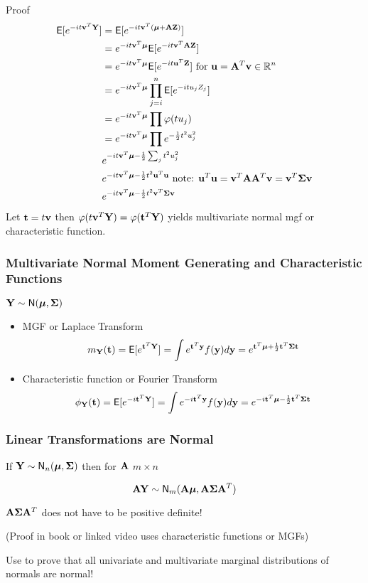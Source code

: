 \documentclass[handout]{beamer}
\begin{document}
\begin{frame}{Proof}
\begin{align*}
\textsf{E}[e^{-i t\mathbf{v}^T\mathbf{Y}}] & =\textsf{E}[e^{-i t \mathbf{v}^T(\boldsymbol{\mu} + \mathbf{A} \mathbf{Z})}] \\
                & = e^{-i t \mathbf{v}^T{\boldsymbol{\mu}}} \textsf{E}[e^{-it \mathbf{v}^T\mathbf{A} \mathbf{Z}}]  \\
                & =  e^{-i t \mathbf{v}^T{\boldsymbol{\mu}}} \textsf{E}[e^{-it \mathbf{u}^T \mathbf{Z}}] \text{ for } \mathbf{u} = \mathbf{A}^T\mathbf{v} \in \mathbb{R}^n \\
                & =  e^{-i t \mathbf{v}^T{\boldsymbol{\mu}}} \prod_{j = i}^n\textsf{E}[e^{-it u_j Z_j}] \\
                 & =  e^{-i t \mathbf{v}^T{\boldsymbol{\mu}}} \prod \varphi(t u_j) \\
                   & =  e^{-i t \mathbf{v}^T{\boldsymbol{\mu}}} \prod e^{- \frac 1 2 t^2 u_j^2} \\
                   & e^{-i t \mathbf{v}^T \boldsymbol{\mu}   - \frac 1 2 \sum_j t^2 u_j^2} \\
                   & e^{-i t \mathbf{v}^T \boldsymbol{\mu} - \frac 1 2 t^2 \mathbf{u}^T\mathbf{u}}  \text{ note: } \mathbf{u}^T\mathbf{u} = \mathbf{v}^T\mathbf{A}\mathbf{A}^T\mathbf{v} = \mathbf{v}^T\boldsymbol{\Sigma} \mathbf{v} \\
                   &  e^{-i t \mathbf{v}^T \boldsymbol{\mu} - \frac 1 2 t^2 \mathbf{v}^T\boldsymbol{\Sigma} \mathbf{v} }
\end{align*}
Let $\mathbf{t} = t \mathbf{v}$ then $\varphi(t \mathbf{v}^T \mathbf{Y}) = \varphi(\mathbf{t}^T \mathbf{Y})$ yields multivariate normal mgf or characteristic function.
\end{frame}

\begin{frame} \frametitle{Multivariate Normal Moment Generating and Characteristic Functions}

$\mathbf{Y} \sim \textsf{N}(\boldsymbol{\mu}, \boldsymbol{\Sigma})$

\begin{itemize}
  \item MGF or Laplace Transform
  $$m_{\mathbf{Y}}(\mathbf{t}) = \textsf{E}[e^{\mathbf{t}^T\mathbf{Y}}]
  = \int e^{\mathbf{t}^T\mathbf{y}} f(\mathbf{y})  d\mathbf{y}
= e^{\mathbf{t}^T\boldsymbol{\mu} + \frac{1}{2} \mathbf{t}^T \boldsymbol{\Sigma} \mathbf{t}}
  $$

  \item Characteristic function or Fourier Transform
  $$\phi_{\mathbf{Y}}(\mathbf{t}) = \textsf{E}[e^{-i \mathbf{t}^T\mathbf{Y}}]
  = \int e^{ -i \mathbf{t}^T\mathbf{y}} f(\mathbf{y})  d\mathbf{y}
= e^{-i \mathbf{t}^T\boldsymbol{\mu}  - \frac{1}{2} \mathbf{t}^T \boldsymbol{\Sigma} \mathbf{t}}
  $$
\end{itemize}
\end{frame}

\begin{frame} \frametitle{Linear Transformations are Normal}

If $\mathbf{Y} \sim \textsf{N}_n(\boldsymbol{\mu}, \boldsymbol{\Sigma})$  \pause then for $\mathbf{A}$ $m \times n$

$$\mathbf{A} \mathbf{Y} \sim \textsf{N}_m(\mathbf{A} \boldsymbol{\mu}, \mathbf{A} \boldsymbol{\Sigma} \mathbf{A}^T)$$ \pause


$\mathbf{A} \boldsymbol{\Sigma} \mathbf{A}^T$ does not have to be positive definite! \pause

(Proof in book or linked video uses characteristic functions or MGFs)


\vspace{.5in}

Use to prove that all univariate and multivariate  marginal distributions of normals are normal!


\end{frame}
\end{document}
